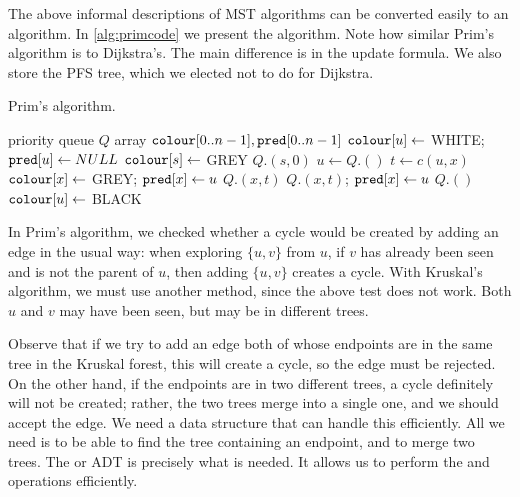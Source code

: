The above informal descriptions of MST algorithms can be converted easily
to an algorithm. In \cref{alg:primcode} we present the algorithm. Note
how similar Prim's algorithm is to Dijkstra's. The main difference is
in the update formula. We also store the PFS tree, which we elected not
to do for Dijkstra.

\begin{algorithm}[H]
  \caption{Prim's algorithm.}
  \label{alg:primcode}
\begin{algorithmic}[1]
	\State priority queue $Q$
	\State array $\colour[0..n-1], \pred[0..n-1]$
		\State $\colour[u] \gets$ WHITE; $\pred[u] \gets NULL$ 
	\EndFor
	\State $\colour[s] \gets $ GREY
	\State $Q$.$(s, 0)$
		\State $u \gets Q$.$()$
			\State $t \gets c(u, x)$
				\State $\colour[x] \gets $ GREY; $\pred[x] \gets u$
				\State $Q$.$(x, t)$
				\State $Q$.$(x, t)$; $\pred[x] \gets u$
			\EndIf
		\EndFor
		\State $Q$.$()$
		\State $\colour[u] \gets $ BLACK
	\EndWhile
	\State \Return{$\pred$}
\EndFunction
\end{algorithmic}
\end{algorithm}


In Prim's algorithm, we checked whether a cycle would be created by adding
an edge in the usual way: when exploring $\{u, v\}$ from $u$, if $v$ has
already been seen and is not the parent of $u$, then adding $\{u, v\}$
creates a cycle. With Kruskal's algorithm, we must use another method,
since the above test does not work. Both $u$ and $v$ may have been seen,
but may be in different trees.

Observe that if we try to add an edge both of whose endpoints are in
the same tree in the Kruskal forest, this will create a cycle, so the
edge must be rejected. On the other hand, if the endpoints are in two
different trees, a cycle definitely will not be created; rather, the two
trees merge into a single one, and we should accept the edge. We need
a data structure that can handle this efficiently. All we need is to be
able to find the tree containing an endpoint, and to merge two trees. The
 or  ADT is precisely what
is needed. It allows us to perform the  and 
operations efficiently. %


